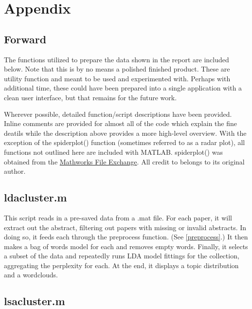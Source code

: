 \documentclass{article}
\begin{document}
\setcounter{section}{6}
\renewcommand{\thesubsection}{\Alph{subsection}.}

\section{Appendix}

\subsection{Forward}

The functions utilized to prepare the data shown in the report are included below. Note that this is by no means a polished finished product. These are utility function and meant to be used and experimented with. Perhaps with additional time, these could have been prepared into a single application with a clean user interface, but that remains for the future work.

Wherever possible, detailed function/script descriptions have been provided. Inline comments are provided for almost all of the code which explain the fine deatils while the description above provides a more high-level overview. With the exception of the spider\textunderscore plot() function (sometimes referred to as a radar plot), all functions not outlined here are included with MATLAB. spider\textunderscore plot() was obtained from the \href{https://www.mathworks.com/matlabcentral/fileexchange/59561-spider--radar--plot}{Mathworks File Exchange}. All credit to belongs to its original author.

\subsection{ldacluster.m}
\label{ldacluster}

This script reads in a pre-saved data from a .mat file. For each paper, it will extract out the abstract, filtering out papers with missing or invalid abstracts. In doing so, it feeds each through the preprocess function. (See \ref{preprocess}.) It then makes a bag of words model for each and removes empty words. Finally, it selects a subset of the data and repeatedly runs LDA model fittings for the collection, aggregating the perplexity for each. At the end, it displays a topic distribution and a wordclouds.



\subsection{lsacluster.m}
\label{lsacluster}
\end{document}
